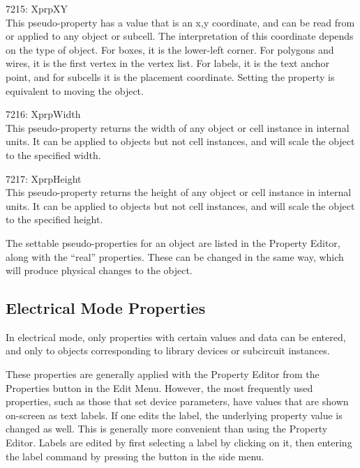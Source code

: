 \begin{description}
\item{7215: {\et XprpXY}}\\
This pseudo-property has a value that is an x,y coordinate, and can be
read from or applied to any object or subcell.  The interpretation of
this coordinate depends on the type of object.  For boxes, it is the
lower-left corner.  For polygons and wires, it is the first vertex in
the vertex list.  For labels, it is the text anchor point, and for
subcells it is the placement coordinate.  Setting the property is
equivalent to moving the object.

\item{7216: {\et XprpWidth}}\\
This pseudo-property returns the width of any object or cell instance
in internal units.  It can be applied to objects but not cell
instances, and will scale the object to the specified width.

\item{7217: {\et XprpHeight}}\\
This pseudo-property returns the height of any object or cell instance
in internal units.  It can be applied to objects but not cell
instances, and will scale the object to the specified height.
\end{description}

The settable pseudo-properties for an object are listed in the {\cb
Property Editor}, along with the ``real'' properties.  These can be
changed in the same way, which will produce physical changes to the
object.

\subsection{Electrical Mode Properties}
\label{elprops}

In electrical mode, only properties with certain values and data can
be entered, and only to objects corresponding to library devices or
subcircuit instances.

These properties are generally applied with the {\cb Property Editor}
from the {\cb Properties} button in the {\cb Edit Menu}.  However, the
most frequently used properties, such as those that set device
parameters, have values that are shown on-screen as text labels.  If
one edits the label, the underlying property value is changed as well. 
This is generally more convenient than using the {\cb Property
Editor}.  Labels are edited by first selecting a label by clicking on
it, then entering the {\cb label} command by pressing the button in
the side menu.

